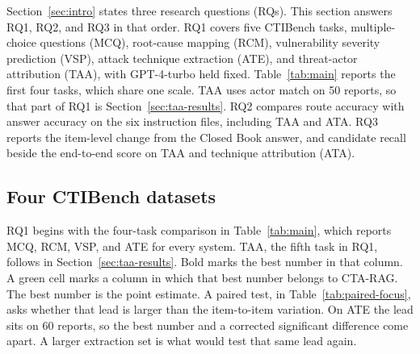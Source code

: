 \documentclass[5p,times,authoryear]{elsarticle}
\begin{document}
Section~\ref{sec:intro} states three research questions (RQs). This section answers RQ1, RQ2, and RQ3 in that order. RQ1 covers five CTIBench tasks, multiple-choice questions (MCQ), root-cause mapping (RCM), vulnerability severity prediction (VSP), attack technique extraction (ATE), and threat-actor attribution (TAA), with GPT-4-turbo held fixed. Table~\ref{tab:main} reports the first four tasks, which share one scale. TAA uses actor match on 50 reports, so that part of RQ1 is Section~\ref{sec:taa-results}. RQ2 compares route accuracy with answer accuracy on the six instruction files, including TAA and ATA. RQ3 reports the item-level change from the Closed Book answer, and candidate recall beside the end-to-end score on TAA and technique attribution (ATA).

\subsection{Four CTIBench datasets}
\label{sec:main-results}

RQ1 begins with the four-task comparison in Table~\ref{tab:main}, which reports MCQ, RCM, VSP, and ATE for every system. TAA, the fifth task in RQ1, follows in Section~\ref{sec:taa-results}. Bold marks the best number in that column. A green cell marks a column in which that best number belongs to CTA-RAG. The best number is the point estimate. A paired test, in Table~\ref{tab:paired-focus}, asks whether that lead is larger than the item-to-item variation. On ATE the lead sits on 60 reports, so the best number and a corrected significant difference come apart. A larger extraction set is what would test that same lead again.
\end{document}
